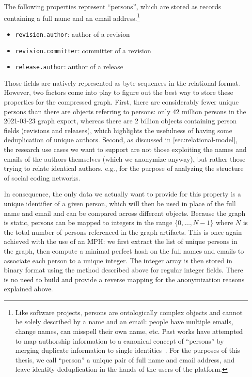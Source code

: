 The following properties represent ``persons'', which are stored as records
containing a full name and an email address.\footnote{Like software projects,
persons are ontologically complex objects and cannot be solely described by a
name and an email: people have multiple emails, change names, can misspell
their own name, etc. Past works have attempted to map authorship information to
a canonical concept of ``persons'' by merging duplicate information to single
identities~\cite{wiese2016mailing, zhu2019empirical}. For the purposes of this
thesis, we call ``person'' a unique pair of full name and email address, and
leave identity deduplication in the hands of the users of the platform.}

\begin{itemize}
    \setlength\itemsep{0em}
    \item \texttt{revision.author}: author of a revision
    \item \texttt{revision.committer}: committer of a revision
    \item \texttt{release.author}: author of a release
\end{itemize}

Those fields are natively represented as byte sequences in the relational
format.  However, two factors come into play to figure out the best way to
store these properties for the compressed graph. First, there are considerably
fewer unique persons than there are objects referring to persons: only 42
million persons in the 2021-03-23 graph export, whereas there are 2 billion
objects containing person fields (revisions and releases), which highlights the
usefulness of having some deduplication of unique authors. Second, as discussed
in \cref{sec:relational-model}, the research use cases we want to support are
not those exploiting the names and emails of the authors themselves (which we
anonymize anyway), but rather those trying to relate identical authors, e.g.,
for the purpose of analyzing the structure of social coding networks.

In consequence, the only data we actually want to provide for this property is
a unique identifier of a given person, which will then be used in place of the
full name and email and can be compared across different objects.
Because the graph is static, persons can be mapped to integers in the range
$\{0,\ldots,N-1\}$ where $N$ is the total number of persons referenced in the
graph artifacts. This is once again achieved with the use of an \gls{MPH}: we
first extract the list of unique persons in the graph, then compute a minimal
perfect hash on the full names and emails to associate each person to a unique
integer. The integer array is then stored in binary format using the method
described above for regular integer fields. There is no need to build and
provide a reverse mapping for the anonymization reasons explained above.

